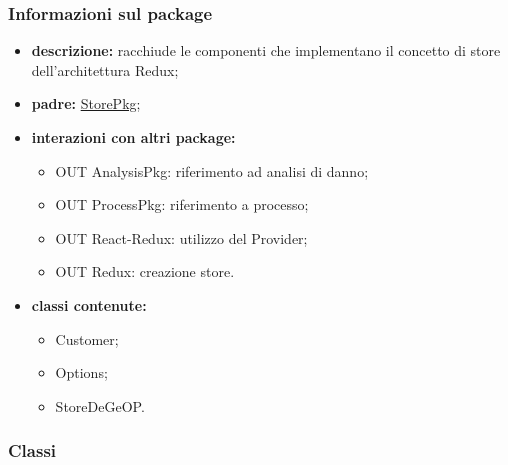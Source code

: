 \subsubsection{Informazioni sul package}
\begin{itemize}
	\item \textbf{descrizione:} racchiude le componenti che implementano il concetto di store dell'architettura Redux;
	\item \textbf{padre:} \hyperref[pkg::StorePkg]{StorePkg};
	\item \textbf{interazioni con altri package:} 
	\begin{itemize}
		\item OUT AnalysisPkg: riferimento ad analisi di danno;
		\item OUT ProcessPkg: riferimento a processo;
		\item OUT React-Redux: utilizzo del Provider;
		\item OUT Redux: creazione store.
	\end{itemize}
	\item \textbf{classi contenute:}
	\begin{itemize}
		\item Customer;
		\item Options;
		\item StoreDeGeOP.
	\end{itemize}
\end{itemize}
\subsubsection{Classi}
